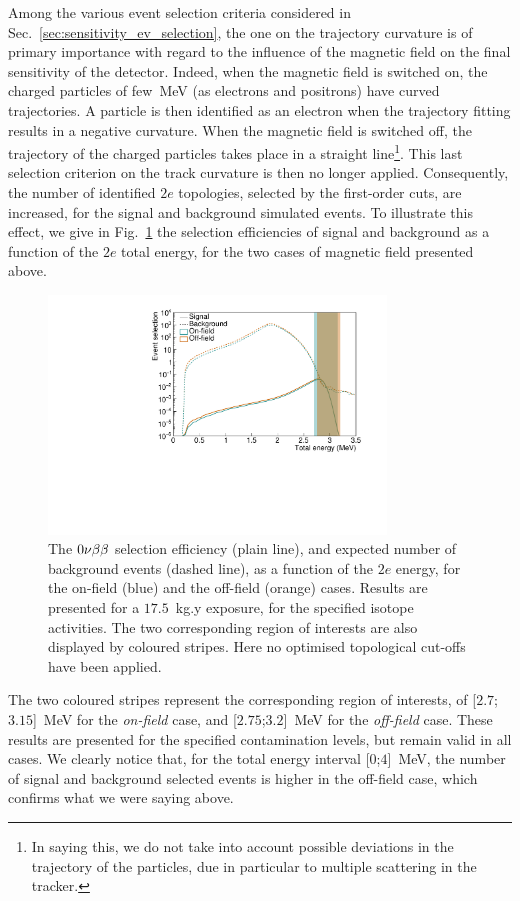 Among the various event selection criteria considered in Sec.~\ref{sec:sensitivity_ev_selection}, the one on the trajectory curvature is of primary importance with regard to the influence of the magnetic field on the final sensitivity of the detector.
Indeed, when the magnetic field is switched on, the charged particles of few~MeV (as electrons and positrons) have curved trajectories.
A particle is then identified as an electron when the trajectory fitting results in a negative curvature.
When the magnetic field is switched off, the trajectory of the charged particles takes place in a straight line\footnote{In saying this, we do not take into account possible deviations in the trajectory of the particles, due in particular to multiple scattering in the tracker.}.
This last selection criterion on the track curvature is then no longer applied.
Consequently, the number of identified $2e$ topologies, selected by the first-order cuts, are increased, for the signal and background simulated events.
To illustrate this effect, we give in Fig.~\ref{fig:eff_0nu_w_wo_B} the selection efficiencies of signal and background as a function of the $2e$ total energy, for the two cases of magnetic field presented above.
\begin{figure}[h!]
  \centering
  \includegraphics[width=0.8\textwidth]{Sensitivity/fig_sensitivity/Nbkg_field.pdf}
  \caption{The $0\nu\beta\beta$ selection efficiency (plain line), and expected number of background events (dashed line), as a function of the $2e$ energy, for the on-field (blue) and the off-field (orange) cases.
    Results are presented for a $17.5$~kg.y exposure, for the specified isotope activities.
    The two corresponding region of interests are also displayed by coloured stripes.
    Here no optimised topological cut-offs have been applied.
    \label{fig:eff_0nu_w_wo_B}}
\end{figure}
The two coloured stripes represent the corresponding region of interests, of [$2.7$;$3.15$]~MeV for the \emph{on-field} case, and [$2.75$;$3.2$]~MeV for the \emph{off-field} case.
These results are presented for the specified contamination levels, but remain valid in all cases.
We clearly notice that, for the total energy interval [$0$;$4$]~MeV, the number of signal and background selected events is higher in the off-field case, which confirms what we were saying above.

